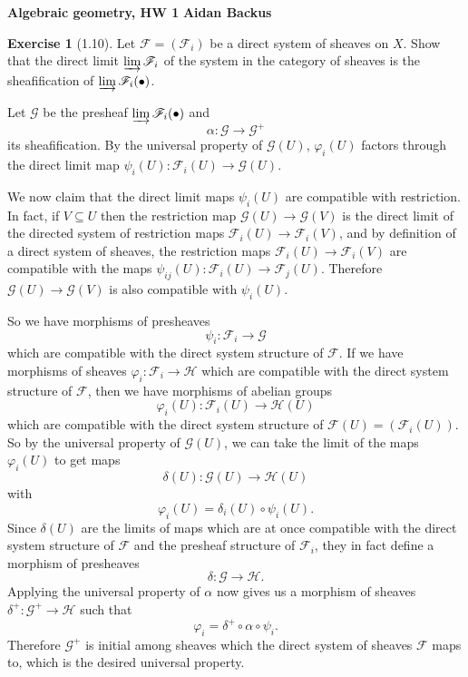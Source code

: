 \documentclass[10pt]{article}
\theoremstyle{definition}
\newtheorem{exer}{Exercise}
\begin{document}
\noindent
\large\textbf{Algebraic geometry, HW 1} \hfill \textbf{Aidan Backus} \\

\begin{exer}[1.10]
Let $\mathscr F = (\mathscr F_i)$ be a direct system of sheaves on $X$.
Show that the direct limit $\varinjlim \mathscr F_i$ of the system in the category of sheaves is the sheafification of $\varinjlim \mathscr F_i(\bullet)$.
\end{exer}

Let $\mathscr G$ be the presheaf $\varinjlim \mathscr F_i(\bullet)$ and
$$\alpha: \mathscr G \to \mathscr G^+$$
its sheafification.
By the universal property of $\mathscr G(U)$, $\varphi_i(U)$ factors through the direct limit map $\psi_i(U): \mathscr F_i(U) \to \mathscr G(U)$.

We now claim that the direct limit maps $\psi_i(U)$ are compatible with restriction.
In fact, if $V \subseteq U$ then the restriction map $\mathscr G(U) \to \mathscr G(V)$ is the direct limit of the directed system of restriction maps $\mathscr F_i(U) \to \mathscr F_i(V)$, and by definition of a direct system of sheaves, the restriction maps $\mathscr F_i(U) \to \mathscr F_i(V)$ are compatible with the maps $\psi_{ij}(U): \mathscr F_i(U) \to \mathscr F_j(U)$.
Therefore $\mathscr G(U) \to \mathscr G(V)$ is also compatible with $\psi_i(U)$.

So we have morphisms of presheaves
$$\psi_i: \mathscr F_i \to \mathscr G$$
which are compatible with the direct system structure of $\mathscr F$.
If we have morphisms of sheaves $\varphi_i: \mathscr F_i \to \mathscr H$ which are compatible with the direct system structure of $\mathscr F$, then we have morphisms of abelian groups
$$\varphi_i(U): \mathscr F_i(U) \to \mathscr H(U)$$
which are compatible with the direct system structure of $\mathscr F(U) = (\mathscr F_i(U))$.
So by the universal property of $\mathscr G(U)$, we can take the limit of the maps $\varphi_i(U)$ to get maps
$$\delta(U): \mathscr G(U) \to \mathscr H(U)$$
with
$$\varphi_i(U) = \delta_i(U) \circ \psi_i(U).$$
Since $\delta(U)$ are the limits of maps which are at once compatible with the direct system structure of $\mathscr F$ and the presheaf structure of $\mathscr F_i$, they in fact define a morphism of presheaves
$$\delta: \mathscr G \to \mathscr H.$$
Applying the universal property of $\alpha$ now gives us a morphism of sheaves $\delta^+: \mathscr G^+ \to \mathscr H$ such that
$$\varphi_i = \delta^+ \circ \alpha \circ \psi_i.$$
Therefore $\mathscr G^+$ is initial among sheaves which the direct system of sheaves $\mathscr F$ maps to, which is the desired universal property.
\end{document}
